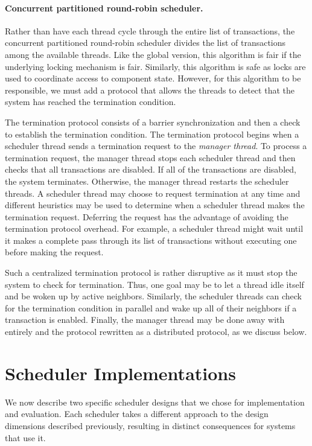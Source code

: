 \paragraph{Concurrent partitioned round-robin scheduler.}
Rather than have each thread cycle through the entire list of transactions, the concurrent partitioned round-robin scheduler divides the list of transactions among the available threads.
Like the global version, this algorithm is fair if the underlying locking mechanism is fair.
Similarly, this algorithm is safe as locks are used to coordinate access to component state.
However, for this algorithm to be responsible, we must add a protocol that allows the threads to detect that the system has reached the termination condition.

The termination protocol consists of a barrier synchronization and then a check to establish the termination condition.
The termination protocol begins when a scheduler thread sends a termination request to the \emph{manager thread}.
To process a termination request, the manager thread stops each scheduler thread and then checks that all transactions are disabled.
If all of the transactions are disabled, the system terminates.
Otherwise, the manager thread restarts the scheduler threads.
A scheduler thread may choose to request termination at any time and different heuristics may be used to determine when a scheduler thread makes the termination request.
Deferring the request has the advantage of avoiding the termination protocol overhead.
For example, a scheduler thread might wait until it makes a complete pass through its list of transactions without executing one before making the request.

Such a centralized termination protocol is rather disruptive as it must stop the system to check for termination.
Thus, one goal may be to let a thread idle itself and be woken up by active neighbors.
Similarly, the scheduler threads can check for the termination condition in parallel and wake up all of their neighbors if a transaction is enabled.
Finally, the manager thread may be done away with entirely and the protocol rewritten as a distributed protocol, as we discuss below.

\section{Scheduler Implementations}
\label{scheduler_implementation}

We now describe two specific scheduler designs that we chose for implementation and evaluation.
Each scheduler takes a different approach to the design dimensions described previously, resulting in distinct consequences for systems that use it.

